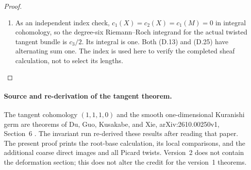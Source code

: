 \begin{proof}
\begin{enumerate}[label=\arabic*.,leftmargin=*]
\item As an independent index check, $c_1(X)=c_2(X)=c_1(M)=0$ in integral
cohomology, so the degree-six Riemann--Roch integrand for the actual
twisted tangent bundle is $c_3/2$. Its integral is one. Both (D.13)
and (D.25) have alternating sum one. The index is used here to
verify the completed sheaf calculation, not to select its lengths.
\end{enumerate}
\end{proof}

\paragraph{Source and re-derivation of the tangent theorem.}
The tangent cohomology $(1,1,1,0)$ and the smooth one-dimensional
Kuranishi germ are theorems of Du, Guo, Kusakabe, and Xie,
arXiv:2610.00250v1, Section~6 \citep{DuEtAl2026v1}.
The invariant run re-derived these results after reading that paper.
The present proof prints the root-base calculation, its local
comparisons, and the additional coarse direct images and all Picard
twists. Version~2 \citep{DuEtAl2026v2} does not contain the deformation
section; this does not alter the credit for the version~1 theorems.




